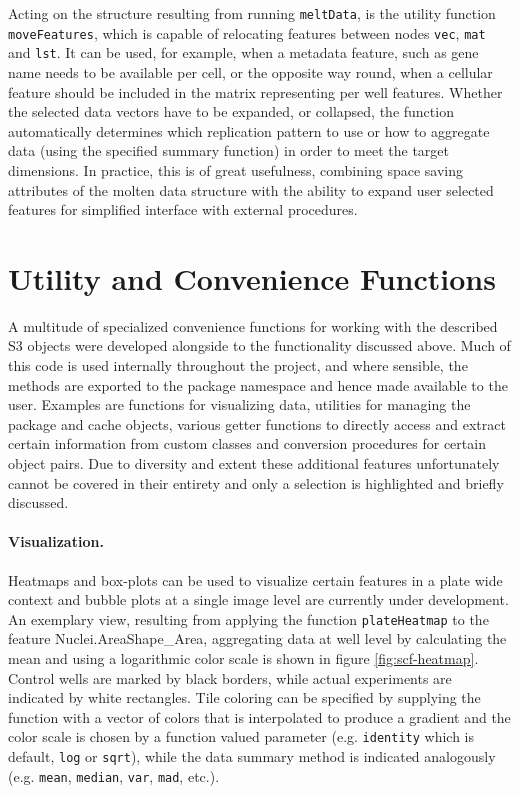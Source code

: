 Acting on the structure resulting from running \texttt{meltData}, is the utility function \texttt{moveFeatures}, which is capable of relocating features between nodes \texttt{vec}, \texttt{mat} and \texttt{lst}. It can be used, for example, when a metadata feature, such as gene name needs to be available per cell, or the opposite way round, when a cellular feature should be included in the matrix representing per well features. Whether the selected data vectors have to be expanded, or collapsed, the function automatically determines which replication pattern to use or how to aggregate data (using the specified summary function) in order to meet the target dimensions. In practice, this is of great usefulness, combining space saving attributes of the molten data structure with the ability to expand user selected features for simplified interface with external procedures.

\section{Utility and Convenience Functions}
A multitude of specialized convenience functions for working with the described S3 objects were developed alongside to the functionality discussed above. Much of this code is used internally throughout the project, and where sensible, the methods are exported to the package namespace and hence made available to the user. Examples are functions for visualizing data, utilities for managing the package and cache objects, various getter functions to directly access and extract certain information from custom classes and conversion procedures for certain object pairs. Due to diversity and extent these additional features unfortunately cannot be covered in their entirety and only a selection is highlighted and briefly discussed.

\paragraph{Visualization.}
Heatmaps and box-plots can be used to visualize certain features in a plate wide context and bubble plots at a single image level are currently under development. An exemplary view, resulting from applying the function \texttt{plateHeatmap} to the feature Nuclei.AreaShape\_Area, aggregating data at well level by calculating the mean and using a logarithmic color scale is shown in figure \ref{fig:scf-heatmap}. Control wells are marked by black borders, while actual  experiments are indicated by white rectangles. Tile coloring can be specified by supplying the function with a vector of colors that is interpolated to produce a gradient and the color scale is chosen by a function valued parameter (e.g. \texttt{identity} which is default, \texttt{log} or \texttt{sqrt}), while the data summary method is indicated analogously (e.g. \texttt{mean}, \texttt{median}, \texttt{var}, \texttt{mad}, etc.).

